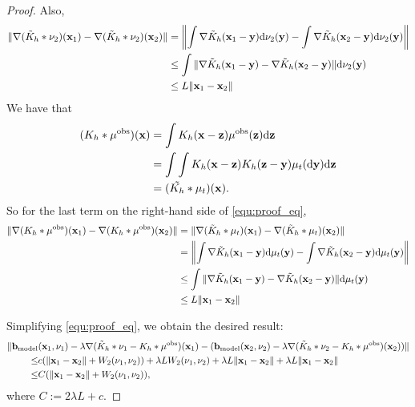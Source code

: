 \begin{proof}
Also,
\begin{align*}
\|\nabla(\tilde{K}_h*\nu_2)(\mathbf{x}_1)-\nabla(\tilde{K}_h*\nu_2)(\mathbf{x}_2)\| &= \left\|\int \nabla \tilde{K}_h (\mathbf{x}_1-\mathbf{y})\mathrm{d}\nu_2(\mathbf{y})-\int\nabla\tilde{K}_h (\mathbf{x}_2-\mathbf{y})\mathrm{d}\nu_2(\mathbf{y})\right\|\\
&\leq \int \|\nabla\tilde{K}_h (\mathbf{x}_1-\mathbf{y})-\nabla\tilde{K}_h(\mathbf{x}_2-\mathbf{y})\|\mathrm{d}\nu_2(\mathbf{y})\\
&\leq L \|\mathbf{x}_1-\mathbf{x}_2\|
\end{align*}
We have that
\begin{align*}
(K_h*\mu^\mathrm{obs})(\mathbf{x})&= \int K_h(\mathbf{x}-\mathbf{z})\mu^\mathrm{obs}(\mathbf{z})\mathrm{d}\mathbf{z}\\
&=\int \int K_h(\mathbf{x}-\mathbf{z})K_h(\mathbf{z}-\mathbf{y})\mu_t(\mathrm{d}\mathbf{y})\mathrm{d}\mathbf{z}\\
&= (\tilde{K_h}*\mu_t)(\mathbf{x}).
\end{align*}
So for the last term on the right-hand side of \eqref{equ:proof_eq}, 
\begin{align*}
\|\nabla(K_h*\mu^\mathrm{obs})(\mathbf{x}_1)-\nabla(K_h*\mu^\mathrm{obs})(\mathbf{x}_2)\| &= \|\nabla(\tilde{K}_h*\mu_t)(\mathbf{x}_1)-\nabla(\tilde{K}_h*\mu_t)(\mathbf{x}_2)\|\\
&= \left\|\int \nabla \tilde{K}_h(\mathbf{x}_1-\mathbf{y})\mathrm{d}\mu_t(\mathbf{y})-\int\nabla\tilde{K}_h(\mathbf{x}_2-\mathbf{y}) \mathrm{d}\mu_t(\mathbf{y})\right\|\\
&\leq \int \|\nabla\tilde{K}_h(\mathbf{x}_1-\mathbf{y})-\nabla\tilde{K}_h(\mathbf{x}_2-\mathbf{y})\| \mathrm{d}\mu_t(\mathbf{y})\\
&\leq L \|\mathbf{x}_1-\mathbf{x}_2\|
\end{align*}

Simplifying \eqref{equ:proof_eq}, we obtain the desired result:
\begin{align*}
\|\mathbf{b}_{\mathrm{model}}&(\mathbf{x}_1,\nu_1) - \lambda \nabla (\tilde{K}_h*\nu_1-K_h * \mu^\mathrm{obs})(\mathbf{x}_1) - (\mathbf{b}_{\mathrm{model}}(\mathbf{x}_2,\nu_2) - \lambda \nabla (\tilde{K}_h*\nu_2-K_h * \mu^\mathrm{obs})(\mathbf{x}_2))\| \\
\leq & c(\|\mathbf{x}_1-\mathbf{x}_2\|+ W_2(\nu_1,\nu_2)) + \lambda L W_2(\nu_1,\nu_2) +\lambda L \|\mathbf{x}_1-\mathbf{x}_2\| + \lambda L \|\mathbf{x}_1-\mathbf{x}_2\|\\
\leq & C(\|\mathbf{x}_1 - \mathbf{x}_2\| + W_2(\nu_1,\nu_2)),
\end{align*}
where $C:=2\lambda L + c$.
\end{proof}

